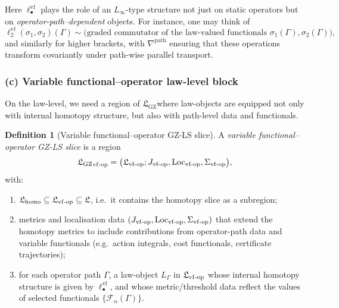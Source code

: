 \documentclass[11pt]{book}
\theoremstyle{plain}
\theoremstyle{definition}
\newtheorem{definition}[theorem]{Definition} \theoremstyle{remark}
\newcommand{\GZLS}{\ensuremath{\mathfrak{L}_{\mathrm{GZ}}}}       \newcommand{\GZLT}{\ensuremath{M_{!w}}}                           \newcommand{\GZLOC}{\ensuremath{A_M}}                             \newcommand{\GZLCurv}{\ensuremath{\mathcal{F}_{\mathrm{law}}}}
\begin{document}
Here $\ell_\bullet^{\mathrm{vf}}$ plays the role of an
$L_\infty$-type structure not just on static operators but on
\emph{operator-path–dependent} objects. For instance, one may think of
\[
  \ell_2^{\mathrm{vf}}(\sigma_1,\sigma_2)(\Gamma)
  \sim
  \text{(graded commutator of the law-valued functionals
  $\sigma_1(\Gamma),\sigma_2(\Gamma)$)},
\]
and similarly for higher brackets, with $\nabla^{\mathrm{path}}$
ensuring that these operations transform covariantly under path-wise
parallel transport.



\subsubsection*{(c) Variable functional--operator law-level block}

On the law-level, we need a region of \GZLS where law-objects are
equipped not only with internal homotopy structure, but also with
path-level data and functionals.

\begin{definition}[Variable functional--operator GZ-LS slice]
A \emph{variable functional--operator GZ-LS slice} is a region
  \[
     {\GZLS}_{\mathrm{vf\text- op}}
     =
     \bigl(
       \mathfrak{L}_{\mathrm{vf\text- op}};
       J_{\mathrm{vf\text- op}},
       \mathrm{Loc}_{\mathrm{vf\text- op}},
       \Sigma_{\mathrm{vf\text- op}}
     \bigr),
  \]
  with:
  \begin{enumerate}[label=\roman*)]
    \item $\mathfrak{L}_{\mathrm{homo}}
           \subseteq \mathfrak{L}_{\mathrm{vf\text- op}}
           \subseteq \mathfrak{L}$, i.e.\ it contains the homotopy
          slice as a subregion;
    \item metrics and localisation data
          $(J_{\mathrm{vf\text- op}},\mathrm{Loc}_{\mathrm{vf\text- op}},
            \Sigma_{\mathrm{vf\text- op}})$ that extend the homotopy
          metrics to include contributions from operator-path data and
          variable functionals (e.g.\ action integrals, cost
          functionals, certificate trajectories);
    \item for each operator path $\Gamma$, a law-object $L_\Gamma$
          in $\mathfrak{L}_{\mathrm{vf\text- op}}$ whose internal
          homotopy structure is given by $\ell_\bullet^{\mathrm{vf}}$,
          and whose metric/threshold data reflect the values of
          selected functionals $\{\mathcal{F}_\alpha(\Gamma)\}$.
  \end{enumerate}
\end{definition}
\end{document}
